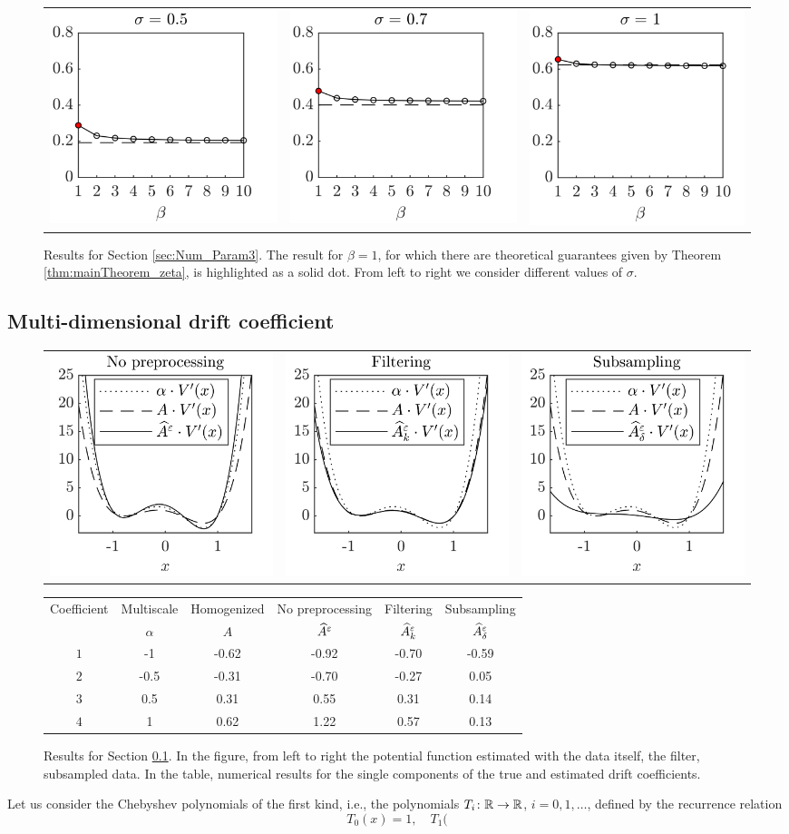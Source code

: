 \documentclass[10pt]{article}
\begin{document}
\begin{figure}[t]
	\centering
	\begin{tabular}{ccc}
		\includegraphics[]{Figures/OUBeta_s5} & \includegraphics[]{Figures/OUBeta_s7}  & \includegraphics[]{Figures/OUBeta_s10} \\
	\end{tabular}
	\caption{Results for Section \ref{sec:Num_Param3}. The result for $\beta=1$, for which there are theoretical guarantees given by Theorem \ref{thm:mainTheorem_zeta}, is highlighted as a solid dot. From left to right we consider different values of $\sigma$.}
	\label{fig:OUBeta}
\end{figure}

\subsection{Multi-dimensional drift coefficient}\label{sec:Num_Multi}

\begin{figure}[t]
	\centering
	\begin{tabular}{ccc}
		\includegraphics[]{Figures/KLNothing} & \includegraphics[]{Figures/KLFilt}  & \includegraphics[]{Figures/KLSubs}
	\end{tabular}

	\begin{tabular}{cccccc}
		\toprule
		Coefficient & Multiscale & Homogenized & No preprocessing  & Filtering  		  & Subsampling  			 \\ 
		& $\alpha$ & $A$   & $\widehat A^\varepsilon$ & $\widehat A^\varepsilon_k$ & $\widehat A^\varepsilon_\delta$ \\
		\midrule
		$1$ &-1   & -0.62 & -0.92 & -0.70 & -0.59\\
		$2$ &-0.5 & -0.31 & -0.70 & -0.27 & 0.05 \\
		$3$ & 0.5 & 0.31  & 0.55  & 0.31  & 0.14 \\
		$4$ & 1   & 0.62  & 1.22  & 0.57  & 0.13 \\
		\bottomrule
	\end{tabular}
	\caption{Results for Section \ref{sec:Num_Multi}. In the figure, from left to right the potential function estimated with the data itself, the filter, subsampled data. In the table, numerical results for the single components of the true and estimated drift coefficients.}
	\label{fig:KLStyle}
\end{figure}

Let us consider the Chebyshev polynomials of the first kind, i.e., the polynomials $T_i\colon \mathbb{R} \to \mathbb{R}$, $i=0, 1, \ldots$, defined by the recurrence relation
\begin{equation}
T_0(x) = 1, \quad T_1(
\end{equation}
\end{document}
